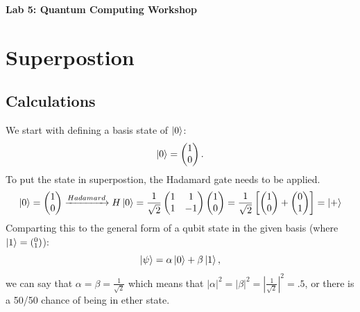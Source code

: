 \documentclass{exam}
\begin{document}
\begin{center}
    \Large
\textbf{Lab 5: Quantum Computing Workshop}
\end{center}
    \section{Superpostion}
    \subsection{Calculations}
    We start with defining a basis state of $\ket{0}$:
    \begin{equation*}
        \ket{0} = \begin{pmatrix}
            1\\0
        \end{pmatrix}.
    \end{equation*}
    To put the state in superpostion, the Hadamard gate needs to be applied.
    \begin{equation}
        \ket{0} = 
        \begin{pmatrix}
            1\\0
        \end{pmatrix}
        \xrightarrow{Hadamard} H\ket{0} = 
        \frac{1}{\sqrt{2}}
        \begin{pmatrix}
        1 & 1\\ 1 & -1    
        \end{pmatrix}
        \begin{pmatrix}
            1\\0
        \end{pmatrix} = 
        \frac{1}{\sqrt{2}}\left[\begin{pmatrix}
            1\\0
        \end{pmatrix} + \begin{pmatrix}
            0\\1
        \end{pmatrix}\right] = \ket{+}
    \end{equation}
    Comparting this to the general form of a qubit state in the given basis (where $\ket{1} = (^0_1)$):
    \begin{equation}
        \ket{\psi} = \alpha \ket{0} + \beta \ket{1},
    \end{equation}
    we can say that $\alpha = \beta = \frac{1}{\sqrt{2}}$ which means that ${\left|\alpha\right|}^2 = {\left|\beta\right|}^2 = {\left|\frac{1}{\sqrt{2}}\right|}^2 = .5$, or there is a 50/50 chance of being in ether state.
\end{document}

